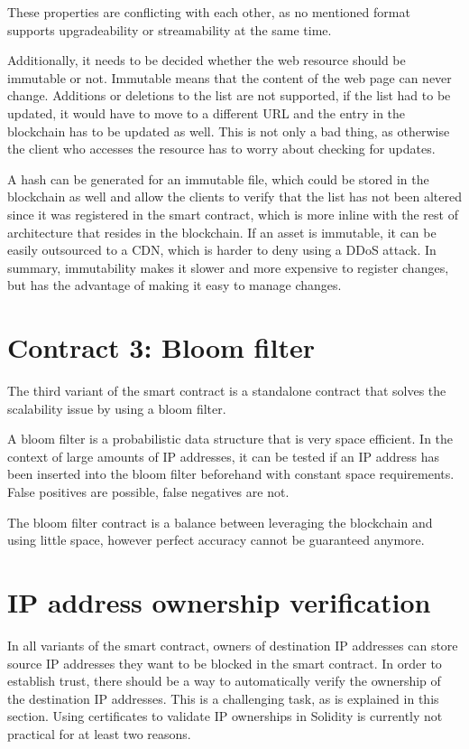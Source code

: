These properties are conflicting with each other, as no mentioned format supports upgradeability or streamability at the same time.

Additionally, it needs to be decided whether the web resource should be immutable or not. Immutable means that the content of the web page can never change. Additions or deletions to the list are not supported, if the list had to be updated, it would have to move to a different URL and the entry in the blockchain has to be updated as well. This is not only a bad thing, as otherwise the client who accesses the resource has to worry about checking for updates.

A hash can be generated for an immutable file, which could be stored in the blockchain as well and allow the clients to verify that the list has not been altered since it was registered in the smart contract, which is more inline with the rest of architecture that resides in the blockchain. If an asset is immutable, it can be easily outsourced to a CDN, which is harder to deny using a DDoS attack.
In summary, immutability makes it slower and more expensive to register changes, but has the advantage of making it easy to manage changes.

\section{Contract 3: Bloom filter}

The third variant of the smart contract is a standalone contract that solves the scalability issue by using a bloom filter.

A bloom filter is a probabilistic data structure that is very space efficient. In the context of large amounts of IP addresses, it can be tested if an IP address has been inserted into the bloom filter beforehand with constant space requirements. False positives are possible, false negatives are not.

The bloom filter contract is a balance between leveraging the blockchain and using little space, however perfect accuracy cannot be guaranteed anymore.

\section{IP address ownership verification}
In all variants of the smart contract, owners of destination IP addresses can store source IP addresses they want to be blocked in the smart contract. In order to establish trust, there should be a way to automatically verify the ownership of the destination IP addresses. This is a challenging task, as is explained in this section. Using certificates to validate IP ownerships in Solidity is currently not practical for at least two reasons.

